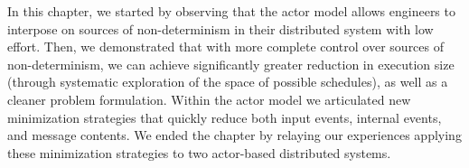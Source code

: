 In this chapter, we started by observing that the actor model allows engineers to interpose
on sources of non-determinism in their distributed system with low effort.
Then, we demonstrated that with
more complete control over sources of non-determinism, we can achieve
significantly greater reduction in execution size (through systematic
exploration of the space of possible schedules), as well as a cleaner
problem formulation. Within the actor model we articulated new minimization
strategies that quickly reduce both input events,
internal events, and message contents. We ended the chapter by relaying our
experiences applying these minimization strategies to two actor-based
distributed systems.


